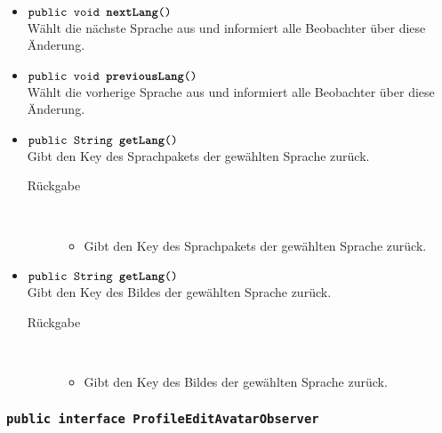 \begin{description}
\begin{itemize}
		\item $\texttt{public void \textbf{nextLang}()}$ \\ Wählt die nächste Sprache aus und informiert alle Beobachter über diese Änderung.
		
		\item $\texttt{public void \textbf{previousLang}()}$ \\ Wählt die vorherige Sprache aus und informiert alle Beobachter über diese Änderung.
		
		\item $\texttt{public String \textbf{getLang}()}$ \\ Gibt den Key des Sprachpakets der gewählten Sprache zurück.
		\begin{description}
			\item[Rückgabe] \hfill \\
			\vspace{-.8cm}
			\begin{itemize}
				\item Gibt den Key des Sprachpakets der gewählten Sprache zurück.
			\end{itemize}
		\end{description}
		
		\item $\texttt{public String \textbf{getLang}()}$ \\ Gibt den Key des Bildes der gewählten Sprache zurück.
		\begin{description}
			\item[Rückgabe] \hfill \\
			\vspace{-.8cm}
			\begin{itemize}
				\item Gibt den Key des Bildes der gewählten Sprache zurück.
			\end{itemize}
		\end{description}
	\end{itemize}
\end{description}

\subsubsection{\normalfont \texttt{public interface \textbf{ProfileEditAvatarObserver}}}

